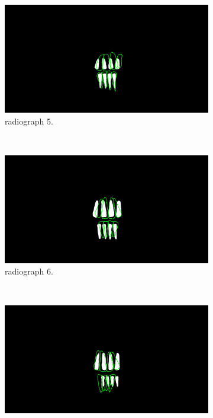 \documentclass[a4paper,10pt]{article}
\begin{document}
\begin{figure}
\begin{subfigure}[b]{0.45\textwidth}
                \includegraphics[width=\textwidth]{Images/segLand,5.jpg}
                \caption{ radiograph 5.}
                \label{fig:comp3}
        \end{subfigure}
        ~ %
        \begin{subfigure}[b]{0.45\textwidth}
                \includegraphics[width=\textwidth]{Images/segLand,6.jpg}
                \caption{ radiograph 6.}
                \label{fig:comp3}
        \end{subfigure}
        ~ %
        \begin{subfigure}[b]{0.45\textwidth}
                \includegraphics[width=\textwidth]{Images/segLand,7.jpg}

\end{subfigure}
\end{figure}
\end{document}
